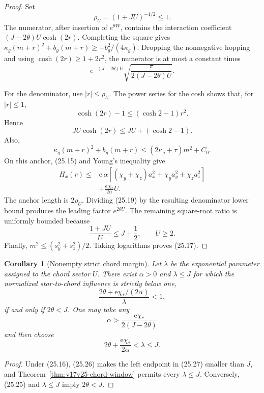 \documentclass[11pt]{article}
\newtheorem{corollary}[theorem]{Corollary}
\theoremstyle{remark}
\begin{document}
\begin{proof}
Set
\[
 \rho_U=(1+JU)^{-1/2}\leq1.                       \tag{25.18}
\]
The numerator, after insertion of \(e^{\theta W}\), contains the
interaction coefficient \((J-2\theta)U\cosh(2r)\).  Completing the
square gives
\(\kappa_g(m+r)^2+b_g(m+r)\geq-b_g^2/(4\kappa_g)\).
Dropping the nonnegative hopping and using
\(\cosh(2r)\geq1+2r^2\), the numerator is at most a constant times
\[
 e^{-(J-2\theta)U}
 \sqrt{\frac{\pi}{2(J-2\theta)U}}.                \tag{25.19}
\]

For the denominator, use \(|r|\leq\rho_U\).  The power series for the
cosh shows that, for \(|r|\leq1\),
\[
 \cosh(2r)-1\leq(\cosh2-1)r^2.                    \tag{25.20}
\]
Hence
\[
 JU\cosh(2r)\leq JU+(\cosh2-1).                   \tag{25.21}
\]
Also,
\[
 \kappa_g(m+r)^2+b_g(m+r)
 \leq(2\kappa_g+\tau)m^2+C_0.                    \tag{25.22}
\]
On this anchor, (25.15) and Young's inequality give
\[
\begin{aligned}
 H_x(r)\leq{}&\mathrm e\,\alpha
 \left[(\chi_y+\chi_z)a_x^2+\chi_ya_y^2+\chi_za_z^2\right]\\
 &+\frac{\mathrm e\,\chi_*}{2\alpha}U.           \tag{25.23}
\end{aligned}
\]
The anchor length is \(2\rho_U\).  Dividing (25.19) by the resulting
denominator lower bound produces the leading factor
\(e^{2\theta U}\).  The remaining square-root ratio is uniformly
bounded because
\[
 \frac{1+JU}{U}\leq J+\frac12,
 \qquad U\geq2.                                   \tag{25.24}
\]
Finally, \(m^2\leq(s_y^2+s_z^2)/2\).  Taking logarithms proves
(25.17).
\end{proof}

\begin{corollary}[Nonempty strict chord margin]
\label{cor:v17v25-margin}
Let \(\lambda\) be the exponential parameter assigned to the chord
sector \(U\).  There exist \(\alpha>0\) and \(\lambda\leq J\) for
which the normalized star-to-chord influence is strictly below one,
\[
 \frac{2\theta+\mathrm e\chi_* /(2\alpha)}{\lambda}<1,           \tag{25.25}
\]
if and only if \(2\theta<J\).  One may take any
\[
 \alpha>\frac{\mathrm e\chi_*}{2(J-2\theta)}       \tag{25.26}
\]
and then choose
\[
 2\theta+\frac{\mathrm e\chi_*}{2\alpha}
 <\lambda\leq J.                                  \tag{25.27}
\]
\end{corollary}

\begin{proof}
Under (25.16), (25.26) makes the left endpoint in (25.27) smaller than
\(J\), and Theorem~\ref{thm:v17v25-chord-window} permits every
\(\lambda\leq J\).  Conversely, (25.25) and \(\lambda\leq J\) imply
\(2\theta<J\).
\end{proof}
\end{document}
